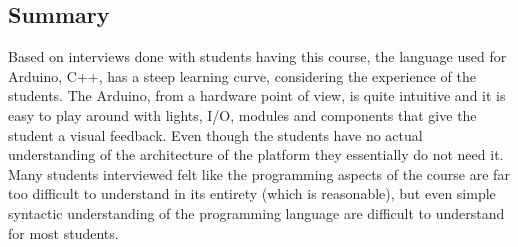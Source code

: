 \subsection{Summary}
Based on interviews done with students having this course, the language used for Arduino, C++, has a steep learning curve, considering the experience of the students. 
The Arduino, from a hardware point of view, is quite intuitive and it is easy to play around with lights, I/O, modules and components that give the student a visual feedback. 
Even though the students have no actual understanding of the architecture of the platform they essentially do not need it. 
Many students interviewed felt like the programming aspects of the course are far too difficult to understand in its entirety (which is reasonable), but even simple syntactic understanding of the programming language are difficult to understand for most students. 



